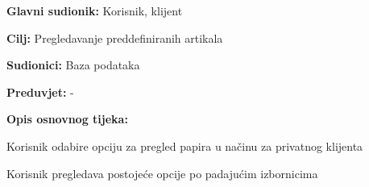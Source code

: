 					\noindent {}
					\begin{packed_item}
	
						\item \textbf{Glavni sudionik: } Korisnik, klijent
						\item  \textbf{Cilj:} Pregledavanje preddefiniranih artikala
						\item  \textbf{Sudionici:} Baza podataka
						\item  \textbf{Preduvjet:} -
						\item  \textbf{Opis osnovnog tijeka:}
						
						\item[] \begin{packed_enum}
	
							\item Korisnik odabire opciju za pregled papira u načinu za privatnog klijenta
							\item Korisnik pregledava postojeće opcije po padajućim izbornicima
						\end{packed_enum}
					
					\end{packed_item}
				
